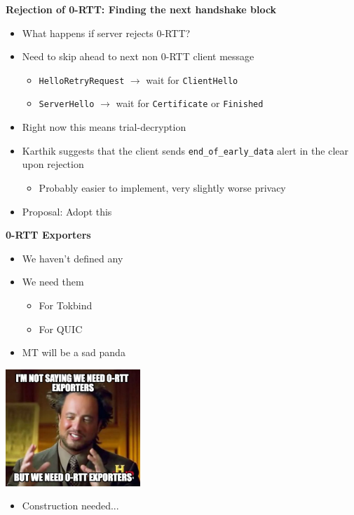 \documentclass[helvetica]{seminar}
\newcommand{\heading}[1]{%
  \begin{center} 
    \large\bf 
    #1 
  \end{center} 
  \vspace{.4 in}}
\begin{document}
\begin{slide}
\heading{Rejection of 0-RTT: Finding the next handshake block}

\begin{itemize}
\item What happens if server rejects 0-RTT?
\item Need to skip ahead to next non 0-RTT client message
  \begin{itemize}
  \item \verb^HelloRetryRequest^ $\rightarrow$ wait for \verb^ClientHello^
  \item \verb^ServerHello^ $\rightarrow$ wait for \verb^Certificate^ or \verb^Finished^
  \end{itemize}
  
\item Right now this means trial-decryption
\item Karthik suggests that the client sends \verb^end_of_early_data^ alert in the clear upon rejection
  \begin{itemize}
  \item Probably easier to implement, very slightly worse privacy
  \end{itemize}

\item Proposal: Adopt this
\end{itemize}
\end{slide}


\begin{slide}
\heading{0-RTT Exporters}

\begin{minipage}{2in}
\begin{itemize}
\item We haven't defined any
\item We need them 
  \begin{itemize}
  \item For Tokbind
  \item For QUIC
  \end{itemize}
\item MT will be a sad panda
\end{itemize}
\end{minipage}
\begin{minipage}{2in}
\includegraphics[width=2in]{850509}
\end{minipage}

\begin{itemize}
\item Construction needed...
\end{itemize} 

\end{slide}
\end{document}
